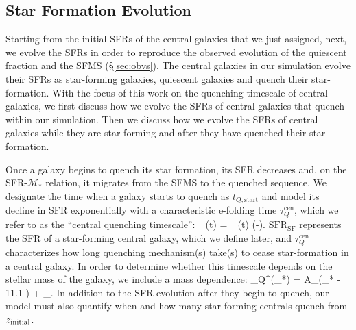 
\subsection{Star Formation Evolution} \label{sec:sfms_evol}
Starting from the initial SFRs of the central galaxies that we just 
assigned, next, we evolve the SFRs in order to reproduce the observed 
evolution of the quiescent fraction and the SFMS (\S \ref{sec:obvs}). 
The central galaxies in our simulation evolve their SFRs as 
star-forming galaxies, quiescent galaxies and quench their 
star-formation. With the focus of this work 
on the quenching timescale of central galaxies, we first discuss 
how we evolve the SFRs of central galaxies that quench within 
our simulation. Then we discuss how we evolve the 
SFRs of central galaxies while they are star-forming and after they 
have quenched their star formation. 

Once a galaxy begins to quench its star formation, its SFR decreases
and, on the SFR-$\mathcal{M}_*$ relation, it migrates from the SFMS 
to the quenched sequence. We designate the time when a galaxy starts 
to quench as $t_{Q, \mathrm{start}}$ and model its decline in SFR
exponentially with a characteristic e-folding time $\tau_Q^\mathrm{cen}$,
which we refer to as the ``central quenching timescale'': 
\beq \label{eq:quenching}
_(t) = _(t) \times 
\exp \left(-\right).
\eeq
$\mathrm{SFR}_\mathrm{SF}$ represents the SFR of a star-forming central 
galaxy, which we define later, and $\tau_Q^\mathrm{cen}$ characterizes 
how long quenching mechanism(s) 
take(s) to cease star-formation in a central galaxy. In order to determine 
whether this timescale depends on the stellar mass of the galaxy, 
we include a mass dependence:
\beq \label{eq:tauq}
\tau_Q^(_*) = 
A_\tau \left(\log\;_* - 11.1 \right) + \delta_\tau.
\eeq
In addition to the SFR evolution after they begin to quench, 
our model must also quantify when and how many star-forming
centrals quench from $z_\mathrm{initial}$. 

